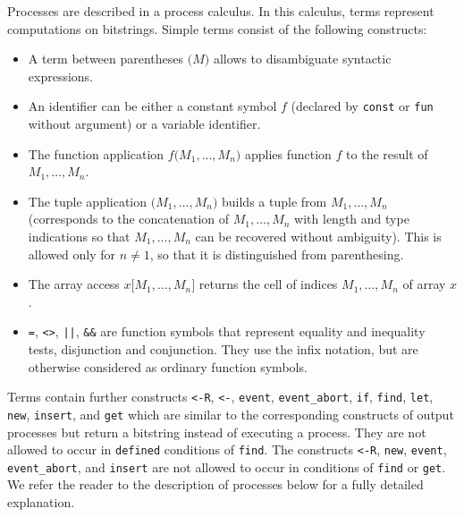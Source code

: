 Processes are described in a process calculus.
In this calculus, terms represent computations on bitstrings. 
Simple terms consist
of the following constructs:
\begin{itemize}

\item A term between parentheses $\texttt{(}M\texttt{)}$
allows to disambiguate syntactic expressions.

\item An identifier can be either a constant symbol $f$
(declared by \texttt{const} or \texttt{fun} without argument)
or a variable identifier.

\item The function application $f\texttt{(}M_1, \ldots, M_n\texttt{)}$
applies function $f$ to the result of $M_1, \ldots, M_n$.

\item The tuple application $\texttt{(}M_1, \ldots, M_n\texttt{)}$
builds a tuple from $M_1, \ldots, M_n$ (corresponds to the concatenation
of $M_1, \ldots, M_n$ with length and type indications so that 
$M_1, \ldots, M_n$ can be recovered without ambiguity).
This is allowed only for $n \neq 1$, so that it is distinguished
from parenthesing.

\item The array access $x\texttt{[}M_1, \ldots, M_n\texttt{]}$
returns the cell of indices $M_1, \ldots, M_n$ of array $x$.

\item \texttt{=}, \texttt{<>}, \texttt{||}, \texttt{\&\&}
are function symbols that represent equality and inequality tests, 
disjunction and conjunction. They use the infix notation, but
are otherwise considered as ordinary function symbols.

\end{itemize}
Terms contain further constructs \texttt{<-R}, \texttt{<-}, \texttt{event}, \texttt{event\string_abort}, \texttt{if}, \texttt{find},
\texttt{let}, \texttt{new}, \texttt{insert}, and \texttt{get} which are similar to the corresponding
constructs of output processes but return a bitstring instead of
executing a process. 
They are not allowed to occur in \texttt{defined} conditions of \texttt{find}.
The constructs \texttt{<-R}, \texttt{new}, \texttt{event}, \texttt{event\string_abort}, and \texttt{insert} are not allowed to 
occur in conditions of \texttt{find} or {\tt get}.
We refer the reader to the description of 
processes below for a fully detailed explanation.
